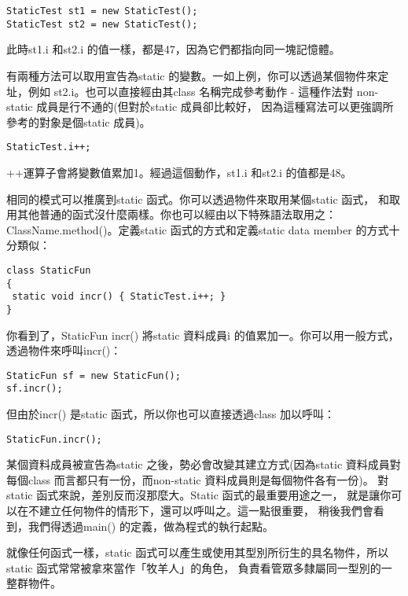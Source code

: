 \begin{Verbatim}[frame=single]
StaticTest st1 = new StaticTest();
StaticTest st2 = new StaticTest();
\end{Verbatim}

此時st1.i 和st2.i 的值一樣，都是47，因為它們都指向同一塊記憶體。

有兩種方法可以取用宣告為static 的變數。一如上例，你可以透過某個物件來定址，例如
st2.i。也可以直接經由其class 名稱完成參考動作 - 這種作法對
non-static 成員是行不通的(但對於static 成員卻比較好，
因為這種寫法可以更強調所參考的對象是個static 成員)。

\begin{Verbatim}[frame=single]
StaticTest.i++;
\end{Verbatim}

++運算子會將變數值累加1。經過這個動作，st1.i 和st2.i 的值都是48。

相同的模式可以推廣到static 函式。你可以透過物件來取用某個static 函式，
和取用其他普通的函式沒什麼兩樣。你也可以經由以下特殊語法取用之：
ClassName.method()。定義static 函式的方式和定義static data member
的方式十分類似：

\begin{Verbatim}[frame=single]
class StaticFun 
{
 static void incr() { StaticTest.i++; }
}
\end{Verbatim}

你看到了，StaticFun incr() 將static 資料成員i 的值累加一。你可以用一般方式，
透過物件來呼叫incr()：

\begin{Verbatim}[frame=single]
StaticFun sf = new StaticFun();
sf.incr();
\end{Verbatim}

但由於incr() 是static 函式，所以你也可以直接透過class 加以呼叫：
\begin{Verbatim}[frame=single]
StaticFun.incr();
\end{Verbatim}

某個資料成員被宣告為static 之後，勢必會改變其建立方式(因為static
資料成員對每個class 而言都只有一份，而non-static 資料成員則是每個物件各有一份)。
對static 函式來說，差別反而沒那麼大。Static 函式的最重要用途之一，
就是讓你可以在不建立任何物件的情形下，還可以呼叫之。這一點很重要，
稍後我們會看到，我們得透過main() 的定義，做為程式的執行起點。

就像任何函式一樣，static 函式可以產生或使用其型別所衍生的具名物件，所以
static 函式常常被拿來當作「牧羊人」的角色，
負責看管眾多隸屬同一型別的一整群物件。

